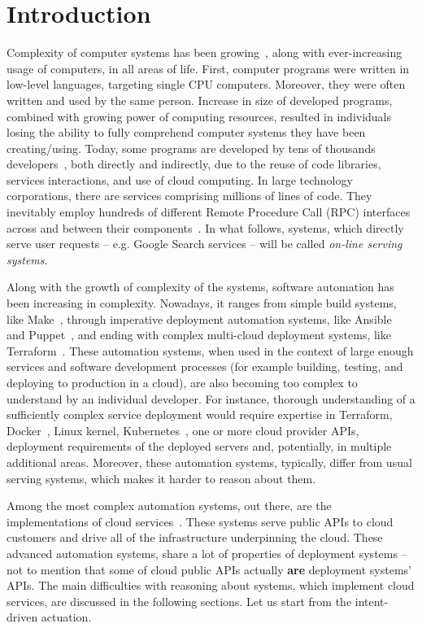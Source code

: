 \newpage
\chapter{Introduction}\label{sec:intro}

Complexity of computer systems has been growing~\cite{complexity-dvorak2009nasa}, along with ever-increasing usage of computers, in all areas of life. First, computer programs were written in low-level languages, targeting single CPU computers. Moreover, they were often written and used by the same person. Increase in size of developed programs, combined with growing power of computing resources, resulted in individuals losing the ability to fully comprehend computer systems they have been creating/using. Today, some programs are developed by tens of thousands developers~\cite{google-billions,facebook-99millio41:online}, both directly and indirectly, due to the reuse of code libraries, services interactions, and use of cloud computing. In large technology corporations, there are services comprising millions of lines of code. They inevitably employ hundreds of different Remote Procedure Call (RPC) interfaces across and between their components~\cite{datacenter-36626}. In what follows, systems, which directly serve user requests -- e.g. Google Search services -- will be called \textit{on-line serving systems}.

Along with the growth of complexity of the systems, software automation has been increasing in complexity. Nowadays, it ranges from simple build systems, like Make~\cite{caseformake1990}, through imperative deployment automation systems, like Ansible~\cite{ansible-hall2013} and Puppet~\cite{puppet-loope2011managing}, and ending with complex multi\hyp{}cloud deployment systems, like Terraform~\cite{terraform-brikman2019}. These automation systems, when used in the context of large enough services and software development processes (for example building, testing, and deploying to production in a cloud), are also becoming too complex to understand by an individual developer. For instance, thorough understanding of a sufficiently complex service deployment would require expertise in Terraform, Docker~\cite{docker-merkel2014}, Linux kernel, Kubernetes~\cite{burns2016borg}, one or more cloud provider APIs, deployment requirements of the deployed servers and, potentially, in multiple additional areas. Moreover, these automation systems, typically, differ from usual serving systems, which makes it harder to reason about them.

Among the most complex automation systems, out there, are the implementations of cloud services~\cite{cloud-adoption-low2011understanding,cloud-complexity-wood2011understanding,complexity-cloud-Commentary2019Sep}. These systems serve public APIs to cloud customers and drive all of the infrastructure underpinning the cloud. These advanced automation systems, share a lot of properties of deployment systems -- not to mention that some of cloud public APIs actually \textbf{are} deployment systems' APIs. The main difficulties with reasoning about systems, which implement cloud services, are discussed in the following sections. Let us start from the intent-driven actuation.

